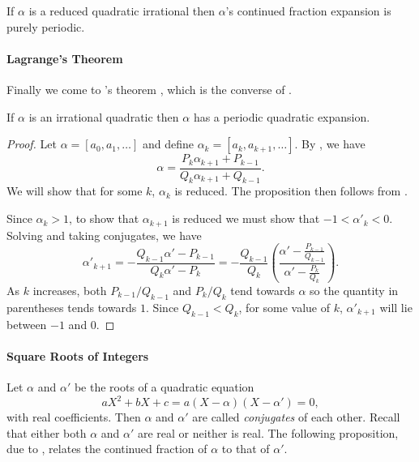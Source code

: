 \begin{proposition}\label{CF:Reduced:Periodic:Prop}  
If $\alpha$ is a reduced quadratic irrational then $\alpha$'s
continued fraction expansion is purely periodic.
\end{proposition}


\paragraph{Lagrange's Theorem}

Finally we come to {\Lagrange}'s theorem \cite{Lagrange1768-tg}, which is the
converse of .

\begin{proposition}[Lagrange]
If $\alpha$ is an irrational quadratic then $\alpha$ has a periodic
quadratic expansion.
\end{proposition}
\begin{proof}
Let $\alpha = [a_0, a_1, \ldots]$ and define $\alpha_k = [a_k,
a_{k+1}, \ldots]$.  By , we have
\begin{equation}\label{CF:Lagrange:1:Eq}
\alpha = \frac{P_k \alpha_{k+1} + P_{k-1}}{Q_{k} \alpha_{k+1} + Q_{k-1}}.
\end{equation}
We will show that for some $k$, $\alpha_k$ is reduced.  The
proposition then follows from . 

Since $\alpha_k > 1$, to show that $\alpha_{k+1}$ is reduced we must show
that $-1 < \alpha'_k < 0$.  Solving  and
taking conjugates, we have
\[
\alpha'_{k+1} = - \frac{Q_{k-1} \alpha' - P_{k-1}}{Q_k \alpha' - P_k}
 = - \frac{Q_{k-1}}{Q_k} 
  \left(\frac{\displaystyle\alpha' -
    \frac{P_{k-1}}{Q_{k-1}}}{\displaystyle\alpha' -
           \frac{P_{k}}{Q_{k}}}\right).
\]
As $k$ increases, both $P_{k-1}/Q_{k-1}$ and $P_k/Q_k$ tend towards
$\alpha$ so the quantity in parentheses tends towards $1$.  Since
$Q_{k-1} < Q_k$, for some value of $k$, $\alpha'_{k+1}$ will lie between
$-1$ and $0$.
\end{proof}

\paragraph{Square Roots of Integers}

Let $\alpha$ and $\alpha'$ be the roots of a quadratic equation
\[
aX^2 + bX + c = a (X - \alpha) (X - \alpha') = 0,
\]
with real coefficients.  Then $\alpha$ and $\alpha'$ are called {\em
conjugates} of each other.
Recall that either both $\alpha$ and $\alpha'$ are real or neither is
real.  The following proposition, due to {\Galois} \cite{Galois1828-oa},
relates the continued fraction of $\alpha$ to that of $\alpha'$.


